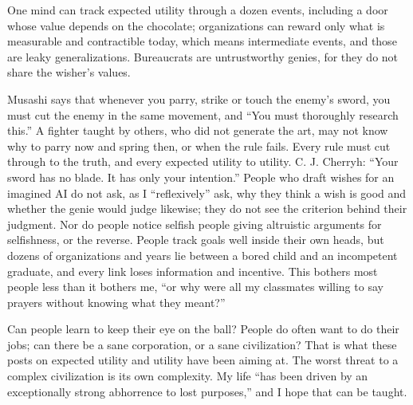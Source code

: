 One mind can track expected utility through a dozen events, including a door whose value depends on the chocolate; organizations can reward only what is measurable and contractible today, which means intermediate events, and those are leaky generalizations. Bureaucrats are untrustworthy genies, for they do not share the wisher's values. 

Musashi says that whenever you parry, strike or touch the enemy's sword, you must cut the enemy in the same movement, and ``You must thoroughly research this.'' A fighter taught by others, who did not generate the art, may not know why to parry now and spring then, or when the rule fails. Every rule must cut through to the truth, and every expected utility to utility. C. J. Cherryh: ``Your sword has no blade. It has only your intention.'' People who draft wishes for an imagined AI do not ask, as I ``reflexively'' ask, why they think a wish is good and whether the genie would judge likewise; they do not see the criterion behind their judgment. Nor do people notice selfish people giving altruistic arguments for selfishness, or the reverse. People track goals well inside their own heads, but dozens of organizations and years lie between a bored child and an incompetent graduate, and every link loses information and incentive. This bothers most people less than it bothers me, ``or why were all my classmates willing to say prayers without knowing what they meant?'' 

Can people learn to keep their eye on the ball? People do often want to do their jobs; can there be a sane corporation, or a sane civilization? That is what these posts on expected utility and utility have been aiming at. The worst threat to a complex civilization is its own complexity. My life ``has been driven by an exceptionally strong abhorrence to lost purposes,'' and I hope that can be taught.
